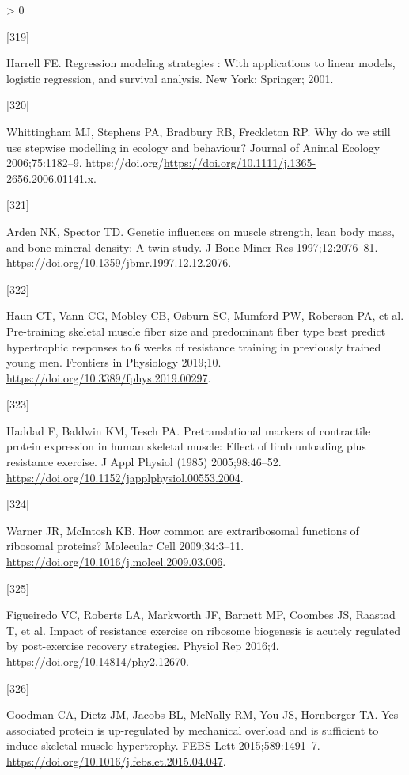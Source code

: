 \documentclass[twoside,10pt]{gihclass} %
\newlength{\cslhangindent}
\newlength{\csllabelwidth}
\newenvironment{CSLReferences}[3] %
 {%
  \setlength{\parindent}{0pt}
  \ifodd #1 \everypar{\setlength{\hangindent}{\cslhangindent}}\ignorespaces\fi
  \ifnum #2 > 0
  \setlength{\parskip}{#2\baselineskip}
  \fi
 }%
 {}
\newcommand{\CSLLeftMargin}[1]{\parbox[t]{\maxof{\widthof{#1}}{\csllabelwidth}}{#1}}
\newcommand{\CSLRightInline}[1]{\parbox[t]{\linewidth}{#1}}
\begin{document}
\begin{CSLReferences}{0}{0}
\leavevmode\hypertarget{ref-RN2881}{}%
\CSLLeftMargin{{[}319{]} }
\CSLRightInline{Harrell FE. Regression modeling strategies : With applications to linear models, logistic regression, and survival analysis. New York: Springer; 2001.}

\leavevmode\hypertarget{ref-RN2882}{}%
\CSLLeftMargin{{[}320{]} }
\CSLRightInline{Whittingham MJ, Stephens PA, Bradbury RB, Freckleton RP. Why do we still use stepwise modelling in ecology and behaviour? Journal of Animal Ecology 2006;75:1182--9. https://doi.org/\url{https://doi.org/10.1111/j.1365-2656.2006.01141.x}.}

\leavevmode\hypertarget{ref-RN2884}{}%
\CSLLeftMargin{{[}321{]} }
\CSLRightInline{Arden NK, Spector TD. Genetic influences on muscle strength, lean body mass, and bone mineral density: A twin study. J Bone Miner Res 1997;12:2076--81. \url{https://doi.org/10.1359/jbmr.1997.12.12.2076}.}

\leavevmode\hypertarget{ref-RN2225}{}%
\CSLLeftMargin{{[}322{]} }
\CSLRightInline{Haun CT, Vann CG, Mobley CB, Osburn SC, Mumford PW, Roberson PA, et al. Pre-training skeletal muscle fiber size and predominant fiber type best predict hypertrophic responses to 6 weeks of resistance training in previously trained young men. Frontiers in Physiology 2019;10. \url{https://doi.org/10.3389/fphys.2019.00297}.}

\leavevmode\hypertarget{ref-RN2180}{}%
\CSLLeftMargin{{[}323{]} }
\CSLRightInline{Haddad F, Baldwin KM, Tesch PA. Pretranslational markers of contractile protein expression in human skeletal muscle: Effect of limb unloading plus resistance exercise. J Appl Physiol (1985) 2005;98:46--52. \url{https://doi.org/10.1152/japplphysiol.00553.2004}.}

\leavevmode\hypertarget{ref-RN2588}{}%
\CSLLeftMargin{{[}324{]} }
\CSLRightInline{Warner JR, McIntosh KB. How common are extraribosomal functions of ribosomal proteins? Molecular Cell 2009;34:3--11. \url{https://doi.org/10.1016/j.molcel.2009.03.006}.}

\leavevmode\hypertarget{ref-RN1746}{}%
\CSLLeftMargin{{[}325{]} }
\CSLRightInline{Figueiredo VC, Roberts LA, Markworth JF, Barnett MP, Coombes JS, Raastad T, et al. Impact of resistance exercise on ribosome biogenesis is acutely regulated by post-exercise recovery strategies. Physiol Rep 2016;4. \url{https://doi.org/10.14814/phy2.12670}.}

\leavevmode\hypertarget{ref-RN1931}{}%
\CSLLeftMargin{{[}326{]} }
\CSLRightInline{Goodman CA, Dietz JM, Jacobs BL, McNally RM, You JS, Hornberger TA. Yes-associated protein is up-regulated by mechanical overload and is sufficient to induce skeletal muscle hypertrophy. FEBS Lett 2015;589:1491--7. \url{https://doi.org/10.1016/j.febslet.2015.04.047}.}


\end{CSLReferences}
\end{document}

